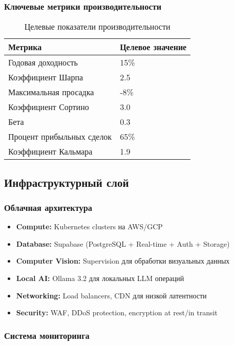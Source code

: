 \documentclass[12pt,a4paper]{article}
\begin{document}
\subsubsection{Ключевые метрики производительности}
\begin{table}[H]
\centering
\caption{Целевые показатели производительности}
\begin{tabular}{@{}ll@{}}
\toprule
\textbf{Метрика} & \textbf{Целевое значение} \\ \midrule
Годовая доходность & 15\% \\
Коэффициент Шарпа & 2.5 \\
Максимальная просадка & -8\% \\
Коэффициент Сортино & 3.0 \\
Бета & 0.3 \\
Процент прибыльных сделок & 65\% \\
Коэффициент Кальмара & 1.9 \\
\bottomrule
\end{tabular}
\end{table}

\subsection{Инфраструктурный слой}

\subsubsection{Облачная архитектура}
\begin{itemize}
    \item \textbf{Compute:} Kubernetes clusters на AWS/GCP
    \item \textbf{Database:} Supabase (PostgreSQL + Real-time + Auth + Storage)
    \item \textbf{Computer Vision:} Supervision для обработки визуальных данных
    \item \textbf{Local AI:} Ollama 3.2 для локальных LLM операций
    \item \textbf{Networking:} Load balancers, CDN для низкой латентности
    \item \textbf{Security:} WAF, DDoS protection, encryption at rest/in transit
\end{itemize}

\subsubsection{Система мониторинга}
\end{document}
